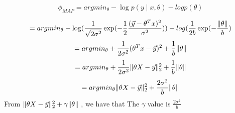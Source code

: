 \begin{answer}

\[ \phi_{MAP}= argmin_{\theta} -\log p(y\mid x, \theta) - log p(\theta) \]

\[ = argmin_{\theta} - \log(  \frac{1}{\sqrt{ 2 \sigma^2} } \exp( - \frac{1}{2} \frac{(\vec{y} - \theta^T x)^2}{\sigma^2})) - log (\frac{1}{2b} \exp (- \frac{\Arrowvert \theta \Arrowvert}{b}) \]
\[ = argmin_{\theta} + \frac {1}{2\sigma^2} (\theta^T x - \vec{y})^2 + \frac {1}{b} \Arrowvert \theta \Arrowvert \]
\[ = argmin_{\theta} + \frac {1}{2\sigma^2}\Arrowvert \theta X - \vec{y}\Arrowvert_2^2   + \frac {1}{b} \Arrowvert \theta \Arrowvert \]
\[ = argmin_{\theta} \Arrowvert \theta X - \vec{y}\Arrowvert_2^2 + \frac{2\sigma^2}{b}  \Arrowvert \theta \Arrowvert \]
From $\Arrowvert \theta X - \vec{y}\Arrowvert_2^2 + \gamma \Arrowvert \theta \Arrowvert$ , we have that The $\gamma$ value is $\frac{2\sigma^2}{b} $

\end{answer}
